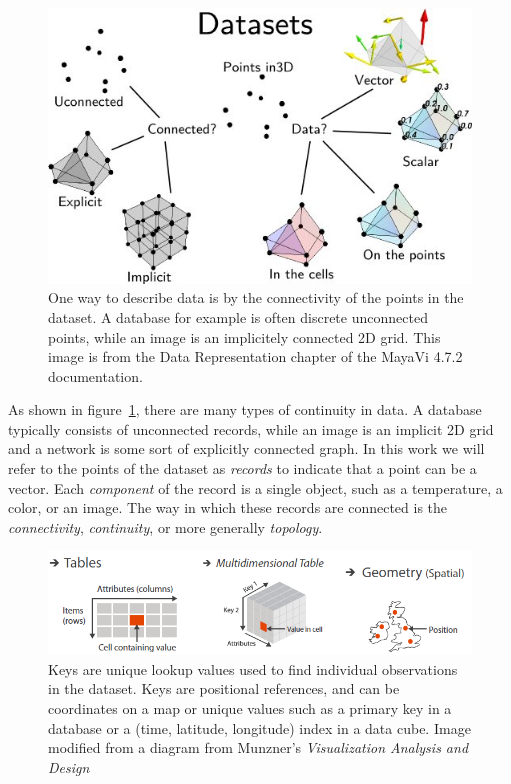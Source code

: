 \documentclass[../main.tex]{subfiles}
\begin{document}
\begin{figure}[H]
    \includegraphics[width=1\textwidth]{figures/intro/dataset_diagram.png}
    \caption{One way to describe data is by the connectivity of the points in the dataset. A database for example is often discrete unconnected points, while an image is an implicitely connected 2D grid. This image is from the Data Representation chapter of the MayaVi 4.7.2 documentation.\cite{DataRepresentationMayavi}}
    \label{fig:intro_data_format}
\end{figure}


As shown in figure~\ref{fig:intro_data_format}, there are many types of continuity in data. A database typically consists of unconnected records, while an image is an implicit 2D grid and a network is some sort of explicitly connected graph. In this work we will refer to the points of the dataset as \textit{records} to indicate that a point can be a vector. Each \textit{component} of the record is a single object, such as a temperature, a color, or an image. The way in which these records are connected is the \textit{connectivity}, \textit{continuity}, or more generally \textit{topology}. 
\begin{figure}[H]
    \includegraphics[width=\textwidth]{figures/intro/munzner_datatypes}
   \caption{Keys are unique lookup values used to find individual observations in the dataset. Keys are positional references, and can be coordinates on a map or unique values such as a primary key in a database or a (time, latitude, longitude) index in a data cube. Image modified from a diagram from Munzner's \textit{Visualization Analysis and Design} \cite{munznerVisualizationAnalysisDesign2014}}
   \label{fig:intro_munzner_datatypes}
   \end{figure}
\end{document}
